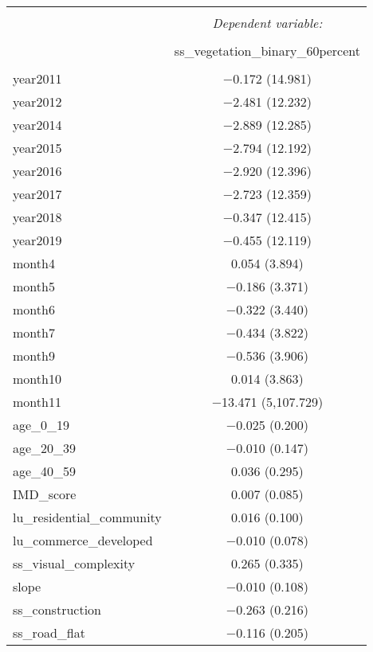 \begin{table}[!htbp] \centering 
  \caption{} 
  \label{} 
\small 
\begin{tabular}{@{\extracolsep{1pt}}lc} 
\\[-1.8ex]\hline 
\hline \\[-1.8ex] 
 & \multicolumn{1}{c}{\textit{Dependent variable:}} \\ 
\cline{2-2} 
\\[-1.8ex] & ss\_vegetation\_binary\_60percent \\ 
\hline \\[-1.8ex] 
 year2011 & $-$0.172 (14.981) \\ 
  year2012 & $-$2.481 (12.232) \\ 
  year2014 & $-$2.889 (12.285) \\ 
  year2015 & $-$2.794 (12.192) \\ 
  year2016 & $-$2.920 (12.396) \\ 
  year2017 & $-$2.723 (12.359) \\ 
  year2018 & $-$0.347 (12.415) \\ 
  year2019 & $-$0.455 (12.119) \\ 
  month4 & 0.054 (3.894) \\ 
  month5 & $-$0.186 (3.371) \\ 
  month6 & $-$0.322 (3.440) \\ 
  month7 & $-$0.434 (3.822) \\ 
  month9 & $-$0.536 (3.906) \\ 
  month10 & 0.014 (3.863) \\ 
  month11 & $-$13.471 (5,107.729) \\ 
  age\_0\_19 & $-$0.025 (0.200) \\ 
  age\_20\_39 & $-$0.010 (0.147) \\ 
  age\_40\_59 & 0.036 (0.295) \\ 
  IMD\_score & 0.007 (0.085) \\ 
  lu\_residential\_community & 0.016 (0.100) \\ 
  lu\_commerce\_developed & $-$0.010 (0.078) \\ 
  ss\_visual\_complexity & 0.265 (0.335) \\ 
  slope & $-$0.010 (0.108) \\ 
  ss\_construction & $-$0.263 (0.216) \\ 
  ss\_road\_flat & $-$0.116 (0.205) \\ 

\end{tabular}
\end{table}
